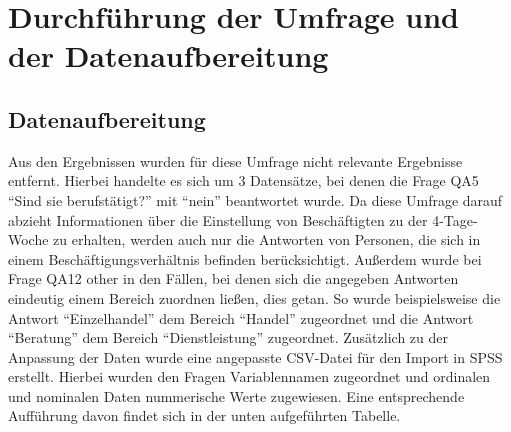 \chapter{Durchführung der Umfrage und der Datenaufbereitung}


 


\section{Datenaufbereitung}
Aus den Ergebnissen wurden für diese Umfrage nicht relevante Ergebnisse entfernt. 
Hierbei handelte es sich um 3 Datensätze, bei denen die Frage QA5 “Sind sie berufstätigt?” 
mit “nein” beantwortet wurde. Da diese Umfrage darauf abzieht Informationen über die 
Einstellung von Beschäftigten zu der 4-Tage-Woche zu erhalten, werden auch nur die 
Antworten von Personen, die sich in einem Beschäftigungsverhältnis befinden berücksichtigt. 
Außerdem wurde bei Frage QA12 other in den Fällen, bei denen sich die angegeben Antworten 
eindeutig einem Bereich zuordnen ließen, dies getan. So wurde beispielsweise die Antwort 
“Einzelhandel” dem Bereich “Handel” zugeordnet und die Antwort “Beratung” dem Bereich 
“Dienstleistung” zugeordnet.  
Zusätzlich zu der Anpassung der Daten wurde eine angepasste CSV-Datei für den Import 
in SPSS erstellt. Hierbei wurden den Fragen Variablennamen zugeordnet und ordinalen 
und nominalen Daten nummerische Werte zugewiesen. Eine entsprechende Aufführung davon 
findet sich in der unten aufgeführten Tabelle. 